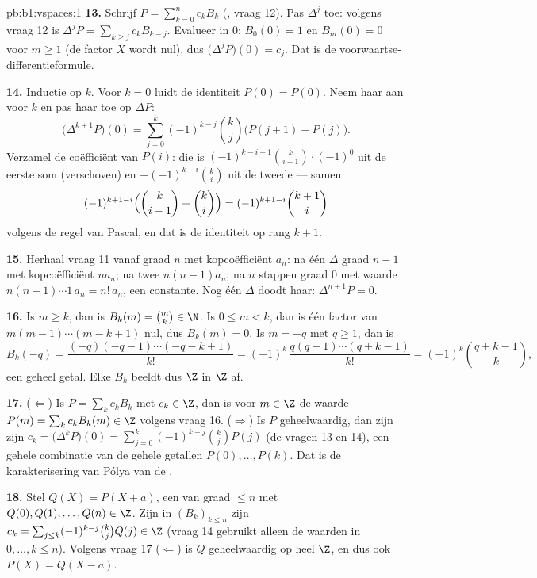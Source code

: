 \begin{solution}{pb:b1:vspaces:1}
\textbf{13.} Schrijf $P = \sum_{k=0}^{n} c_k B_k$ (, vraag
12). Pas $\Delta^{j}$ toe: volgens vraag 12 is $\Delta^{j} P =
\sum_{k \geq j} c_k B_{k-j}$. Evalueer in $0$: $B_0(0) = 1$ en
$B_m(0) = 0$ voor $m \geq 1$ (de factor $X$ wordt nul), dus
$\bigl(\Delta^{j}P\bigr)(0) = c_j$. Dat is de
voorwaartse-differentieformule.

\textbf{14.} Inductie op $k$. Voor $k = 0$ luidt de identiteit
$P(0) = P(0)$. Neem haar aan voor $k$ en pas haar toe op $\Delta
P$:
\[
\bigl(\Delta^{k+1} P\bigr)(0)
= \sum_{j=0}^{k} (-1)^{k-j}\binom kj \bigl(P(j+1) - P(j)\bigr).
\]
Verzamel de coëfficiënt van $P(i)$: die is $(-1)^{k-i+1}\binom
k{i-1}\cdot(-1)^{0}$ uit de eerste som (verschoven) en
$-(-1)^{k-i}\binom ki$ uit de tweede --- samen
\[
(-1)^{k+1-i}\Bigl(\binom k{i-1} + \binom ki\Bigr)
= (-1)^{k+1-i}\binom{k+1}i
\]
volgens de regel van Pascal, en dat is de identiteit op rang $k +
1$.

\textbf{15.} Herhaal vraag 11 vanaf graad $n$ met kopcoëfficiënt
$a_n$: na één $\Delta$ graad $n-1$ met kopcoëfficiënt $n a_n$; na
twee $n(n-1)a_n$; na $n$ stappen graad $0$ met waarde $n(n-1)\cdots
1\, a_n = n!\,a_n$, een constante. Nog één $\Delta$ doodt haar:
$\Delta^{n+1}P = 0$.

\textbf{16.} Is $m \geq k$, dan is $B_k(m) = \binom mk \in \N$. Is
$0 \leq m < k$, dan is één factor van $m(m-1)\cdots(m-k+1)$ nul,
dus $B_k(m) = 0$. Is $m = -q$ met $q \geq 1$, dan is
\[
B_k(-q) = \frac{(-q)(-q-1)\cdots(-q-k+1)}{k!}
= (-1)^k\,\frac{q(q+1)\cdots(q+k-1)}{k!}
= (-1)^k \binom{q+k-1}{k},
\]
een geheel getal. Elke $B_k$ beeldt dus $\Z$ in $\Z$ af.

\textbf{17.} ($\Leftarrow$) Is $P = \sum_k c_k B_k$ met $c_k \in
\Z$, dan is voor $m \in \Z$ de waarde $P(m) = \sum_k c_k B_k(m) \in
\Z$ volgens vraag 16. ($\Rightarrow$) Is $P$ geheelwaardig, dan
zijn zijn  $c_k = \bigl(\Delta^k P\bigr)(0) =
\sum_{j=0}^k (-1)^{k-j}\binom kj P(j)$ (de vragen 13 en 14), een
gehele combinatie van de gehele getallen $P(0), \dots, P(k)$. Dat
is de karakterisering van Pólya van de .

\textbf{18.} Stel $Q(X) = P(X + a)$, een  van graad $\leq
n$ met $Q(0), Q(1), \dots, Q(n) \in \Z$. Zijn  in
$(B_k)_{k \leq n}$ zijn $c_k = \sum_{j \leq k}(-1)^{k-j}\binom kj
Q(j) \in \Z$ (vraag 14 gebruikt alleen de waarden in $0, \dots, k
\leq n$). Volgens vraag 17 ($\Leftarrow$) is $Q$ geheelwaardig op
heel $\Z$, en dus ook $P(X) = Q(X - a)$.


\end{solution}
